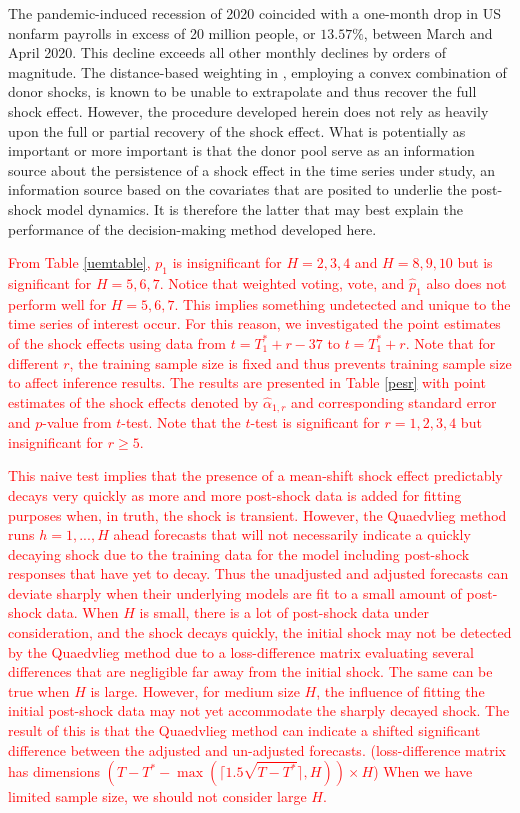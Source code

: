 \documentclass[11pt]{article}
\theoremstyle{definition}
\begin{document}
The pandemic-induced recession of 2020 coincided with a one-month drop in US nonfarm payrolls in excess of 20 million people, or $13.57\%$, between March and April 2020.  This decline exceeds all other monthly declines by orders of magnitude.  The distance-based weighting  in \citep{lin2021minimizing}, employing a convex combination of donor shocks, is known to be unable to extrapolate and thus recover the full shock effect.  However, the procedure developed herein does not rely as heavily upon the full or partial recovery of the shock effect.  What is potentially as important or more important is that the donor pool serve as an information source about the persistence of a shock effect in the time series under study, an information source based on the covariates that are posited to underlie the post-shock model dynamics.  It is therefore the latter that may best explain the performance of the decision-making method developed here.


\textcolor{red}{From Table \ref{uemtable}, $p_1$ is insignificant for $H = 2, 3, 4$ and $H = 8, 9, 10$ but is significant for $H = 5, 6, 7$. Notice that weighted voting, vote, and $\hat{p}_1$ also does not perform well for $H = 5, 6, 7$.  This implies something undetected and unique  to the time series of interest occur.  For this reason, we investigated the point estimates of the shock effects using data from $t = T_1^*+r-37$ to $t = T_1^* + r$.  Note that for different $r$, the training sample size is fixed and thus prevents training sample size to affect inference results. The results are presented in Table \ref{pesr} with point estimates of the shock effects denoted by $\hat{\alpha}_{1, r}$ and corresponding standard error and $p$-value from $t$-test. Note that the $t$-test is significant for $r = 1, 2, 3, 4$ but insignificant for $r\geq 5$.}

\vspace*{0.5cm}\textcolor{red}{ This naive test implies that  the presence of a mean-shift shock effect predictably decays very quickly as more and more post-shock data is added for fitting purposes when, in truth, the shock is transient. However, the Quaedvlieg method runs $h = 1,...,H$ ahead forecasts that will not necessarily indicate a quickly decaying shock due to the training data for the model including post-shock responses that have yet to decay. Thus the unadjusted and adjusted forecasts can deviate sharply when their underlying models are fit to a small amount of post-shock data. When $H$ is small, there is a lot of post-shock data under consideration, and the shock decays quickly, the initial shock   may not be detected by the Quaedvlieg method due to a loss-difference matrix evaluating several differences that are negligible far away from the initial shock. The same can be true when $H$ is large. However, for medium size $H$, the influence of fitting the initial post-shock data may not yet accommodate the sharply decayed shock. The result of this is that the Quaedvlieg method can indicate a shifted significant difference between the adjusted and un-adjusted forecasts.  (loss-difference matrix has dimensions $(T - T^* - \max(\lceil1.5\sqrt{T - T^*}\rceil, H))  \times H$) When we have limited sample size, we should not consider large $H$.}
\end{document}
